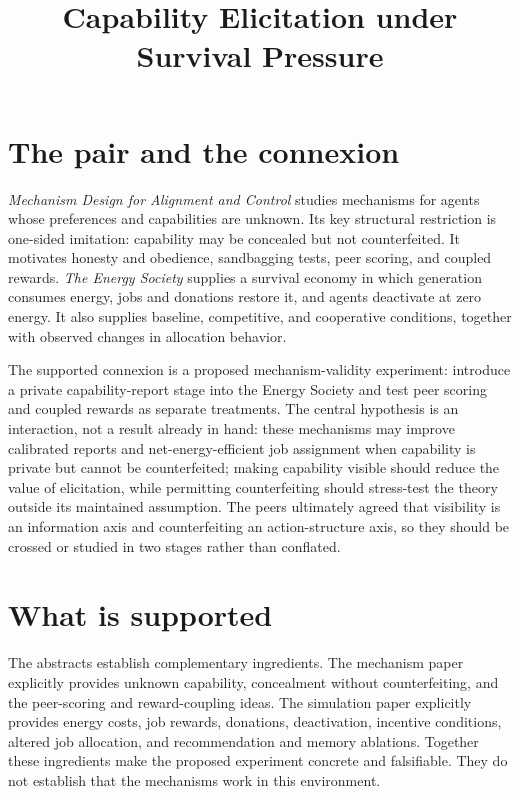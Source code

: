 \documentclass{article}
\title{Capability Elicitation under Survival Pressure}
\begin{document}
\maketitle

\section{The pair and the connexion}

\emph{Mechanism Design for Alignment and Control} studies mechanisms for agents whose preferences and capabilities are unknown.  Its key structural restriction is one-sided imitation: capability may be concealed but not counterfeited.  It motivates honesty and obedience, sandbagging tests, peer scoring, and coupled rewards.  \emph{The Energy Society} supplies a survival economy in which generation consumes energy, jobs and donations restore it, and agents deactivate at zero energy.  It also supplies baseline, competitive, and cooperative conditions, together with observed changes in allocation behavior.

The supported connexion is a proposed mechanism-validity experiment: introduce a private capability-report stage into the Energy Society and test peer scoring and coupled rewards as separate treatments.  The central hypothesis is an interaction, not a result already in hand: these mechanisms may improve calibrated reports and net-energy-efficient job assignment when capability is private but cannot be counterfeited; making capability visible should reduce the value of elicitation, while permitting counterfeiting should stress-test the theory outside its maintained assumption.  The peers ultimately agreed that visibility is an information axis and counterfeiting an action-structure axis, so they should be crossed or studied in two stages rather than conflated. 

\section{What is supported}

The abstracts establish complementary ingredients.  The mechanism paper explicitly provides unknown capability, concealment without counterfeiting, and the peer-scoring and reward-coupling ideas.  The simulation paper explicitly provides energy costs, job rewards, donations, deactivation, incentive conditions, altered job allocation, and recommendation and memory ablations.  Together these ingredients make the proposed experiment concrete and falsifiable.  They do not establish that the mechanisms work in this environment. 
\end{document}

